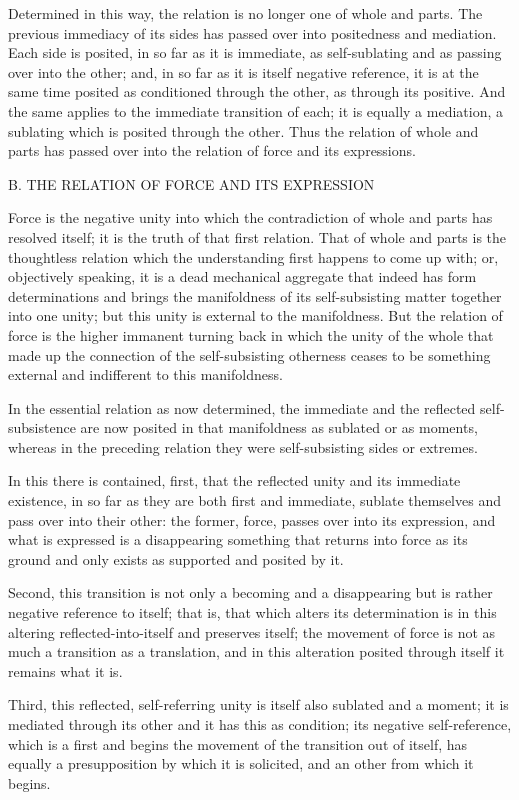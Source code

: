 Determined in this way, the relation is
no longer one of whole and parts.
The previous immediacy of its sides has
passed over into positedness and mediation.
Each side is posited, in so far as it is immediate,
as self-sublating and as passing over into the other;
and, in so far as it is itself negative reference,
it is at the same time posited as conditioned
through the other, as through its positive.
And the same applies to the immediate transition of each;
it is equally a mediation, a sublating
which is posited through the other.
Thus the relation of whole and parts has passed over
into the relation of force and its expressions.

B. THE RELATION OF FORCE AND ITS EXPRESSION

Force is the negative unity into which
the contradiction of whole and parts has resolved itself;
it is the truth of that first relation.
That of whole and parts is the thoughtless relation
which the understanding first happens to come up with;
or, objectively speaking, it is a dead mechanical aggregate
that indeed has form determinations
and brings the manifoldness of
its self-subsisting matter together into one unity;
but this unity is external to the manifoldness.
But the relation of force is the higher immanent turning back
in which the unity of the whole that made up the connection
of the self-subsisting otherness ceases to be something external
and indifferent to this manifoldness.

In the essential relation as now determined,
the immediate and the reflected self-subsistence are
now posited in that manifoldness as sublated or as moments,
whereas in the preceding relation they were self-subsisting
sides or extremes.

In this there is contained,
first, that the reflected unity
and its immediate existence,
in so far as they are both first and immediate,
sublate themselves and pass over into their other:
the former, force, passes over into its expression,
and what is expressed is a disappearing something
that returns into force as its ground
and only exists as supported and posited by it.

Second, this transition is not only
a becoming and a disappearing
but is rather negative reference to itself;
that is, that which alters its determination is
in this altering reflected-into-itself and preserves itself;
the movement of force is not
as much a transition as a translation,
and in this alteration posited through itself
it remains what it is.

Third, this reflected, self-referring unity is
itself also sublated and a moment;
it is mediated through its other
and it has this as condition;
its negative self-reference,
which is a first
and begins the movement of
the transition out of itself,
has equally a presupposition
by which it is solicited,
and an other from which it begins.

